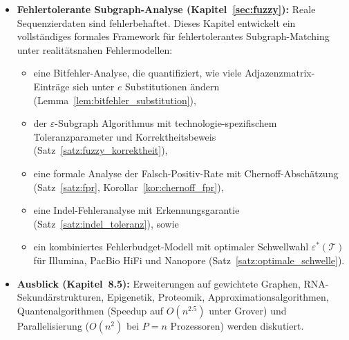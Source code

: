 ﻿\documentclass[a4paper,12pt]{article}
\theoremstyle{definition}
\begin{document}
\begin{itemize}
\begin{itemize}
                    Kerngenoms $\mathcal{M}$ mit Laufzeit
                    $O(M \cdot |\mathcal{M}| \cdot n^3)$
                    (S\"{a}tze~\ref{satz:dedup_korrektheit},
                    \ref{satz:dedup_laufzeit}),
              \item eine LCS-Pseudometrik $d_{\mathrm{LCS}}$ f\"{u}r taxonomische
                    Distanzen (Lemma~\ref{lem:metrik}) und
              \item ein Separierungssatz f\"{u}r korrekte Read-Zuordnung zu
                    Organismen (Satz~\ref{satz:taxonomie}).
          \end{itemize}
    \item \textbf{Fehlertolerante Subgraph-Analyse
          (Kapitel~\ref{sec:fuzzy}):}
          Reale Sequenzierdaten sind fehlerbehaftet. Dieses Kapitel entwickelt
          ein vollst\"{a}ndiges formales Framework f\"{u}r fehlertolerantes
          Subgraph-Matching unter realit\"{a}tsnahen Fehlermodellen:
          \begin{itemize}
              \item eine Bitfehler-Analyse, die quantifiziert, wie viele
                    Adjazenzmatrix-Eintr\"{a}ge sich unter $e$ Substitutionen
                    \"{a}ndern (Lemma~\ref{lem:bitfehler_substitution}),
              \item der $\varepsilon$-Subgraph Algorithmus mit technologie-spezifischem
                    Toleranzparameter und Korrektheitsbeweis
                    (Satz~\ref{satz:fuzzy_korrektheit}),
              \item eine formale Analyse der Falsch-Positiv-Rate mit
                    Chernoff-Absch\"{a}tzung (Satz~\ref{satz:fpr},
                    Korollar~\ref{kor:chernoff_fpr}),
              \item eine Indel-Fehleranalyse mit Erkennungsgarantie
                    (Satz~\ref{satz:indel_toleranz}), sowie
              \item ein kombiniertes Fehlerbudget-Modell mit optimaler
                    Schwellwahl $\varepsilon^*(\mathcal{T})$ f\"{u}r
                    Illumina, PacBio HiFi und Nanopore
                    (Satz~\ref{satz:optimale_schwelle}).
          \end{itemize}
    \item \textbf{Ausblick (Kapitel~8.5):} Erweiterungen auf gewichtete Graphen,
          RNA-Sekund\"{a}r\-strukturen, Epigenetik, Proteomik,
          Approximationsalgorithmen, Quantenalgorithmen (Speedup auf
          $O(n^{2.5})$ unter Grover) und Parallelisierung ($O(n^2)$ bei
          $P = n$ Prozessoren) werden diskutiert.
\end{itemize}
\end{document}
